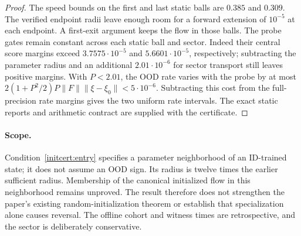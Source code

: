 \begin{proof}
The speed bounds on the first and last static balls are $0.385$ and
$0.309$. The verified endpoint radii leave enough room for a forward
extension of $10^{-5}$ at each endpoint. A first-exit argument keeps the
flow in those balls. The probe gates remain constant across each static
ball and sector. Indeed their central score margins exceed
$3.7575\cdot10^{-5}$ and $5.6601\cdot10^{-5}$, respectively;
subtracting the parameter radius and an additional $2.01\cdot10^{-6}$
for sector transport still leaves positive margins.
With $P<2.01$, the OOD rate varies with the probe by at most
$2(1+P^2/2)P\|F\|\|\xi-\xi_0\|<5\cdot10^{-6}$.
Subtracting this cost from the full-precision rate margins gives the two
uniform rate intervals. The exact static reports and arithmetic contract
are supplied with the certificate.
\end{proof}

\paragraph{Scope.}
Condition~\eqref{initcert:entry} specifies a parameter neighborhood of an
ID-trained state; it does not assume an OOD sign. Its radius is twelve times
the earlier sufficient radius. Membership of the canonical initialized flow
in this neighborhood remains unproved. The result therefore does not
strengthen the paper's existing random-initialization theorem or establish
that specialization alone causes reversal. The offline cohort and witness
times are retrospective, and the sector is deliberately conservative.
